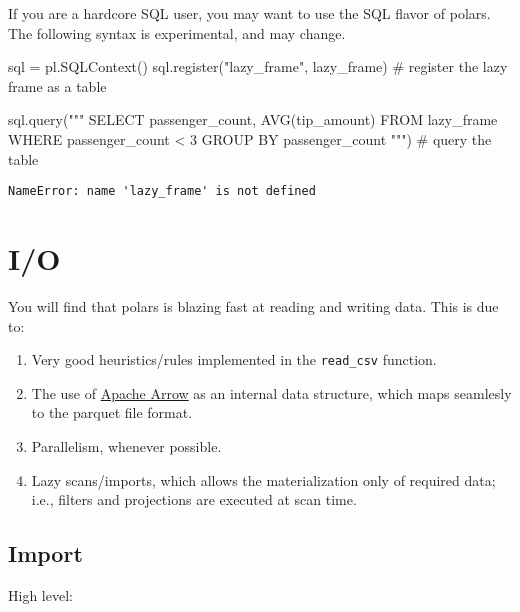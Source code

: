 \documentclass[
  letterpaper,
  DIV=11,
  numbers=noendperiod]{scrartcl}
\newenvironment{Shaded}{\begin{snugshade}}{\end{snugshade}}
\newcommand{\CommentTok}[1]{\textcolor[rgb]{0.37,0.37,0.37}{#1}}
\newcommand{\NormalTok}[1]{\textcolor[rgb]{0.00,0.23,0.31}{#1}}
\newcommand{\OperatorTok}[1]{\textcolor[rgb]{0.37,0.37,0.37}{#1}}
\newcommand{\StringTok}[1]{\textcolor[rgb]{0.13,0.47,0.30}{#1}}
\providecommand{\tightlist}{%
  \setlength{\itemsep}{0pt}\setlength{\parskip}{0pt}}\usepackage{longtable,booktabs,array}
\begin{document}
If you are a hardcore SQL user, you may want to use the SQL flavor of
polars. The following syntax is experimental, and may change.

\begin{Shaded}
\begin{Highlighting}[]
\NormalTok{sql }\OperatorTok{=}\NormalTok{ pl.SQLContext() }
\NormalTok{sql.register(}\StringTok{"lazy\_frame"}\NormalTok{, lazy\_frame) }\CommentTok{\# register the lazy frame as a table}

\NormalTok{sql.query(}\StringTok{"""}
\StringTok{    SELECT passenger\_count, AVG(tip\_amount) FROM lazy\_frame }
\StringTok{    WHERE passenger\_count \textless{} 3}
\StringTok{    GROUP BY passenger\_count}
\StringTok{    """}\NormalTok{) }\CommentTok{\# query the table}
\end{Highlighting}
\end{Shaded}

\begin{verbatim}
NameError: name 'lazy_frame' is not defined
\end{verbatim}

\hypertarget{io}{%
\section{I/O}\label{io}}

You will find that polars is blazing fast at reading and writing data.
This is due to:

\begin{enumerate}
\def\labelenumi{\arabic{enumi}.}
\tightlist
\item
  Very good heuristics/rules implemented in the \texttt{read\_csv}
  function.
\item
  The use of \href{https://arrow.apache.org/}{Apache Arrow} as an
  internal data structure, which maps seamlesly to the parquet file
  format.
\item
  Parallelism, whenever possible.
\item
  Lazy scans/imports, which allows the materialization only of required
  data; i.e., filters and projections are executed at scan time.
\end{enumerate}

\hypertarget{import}{%
\subsection{Import}\label{import}}

High level:
\end{document}
